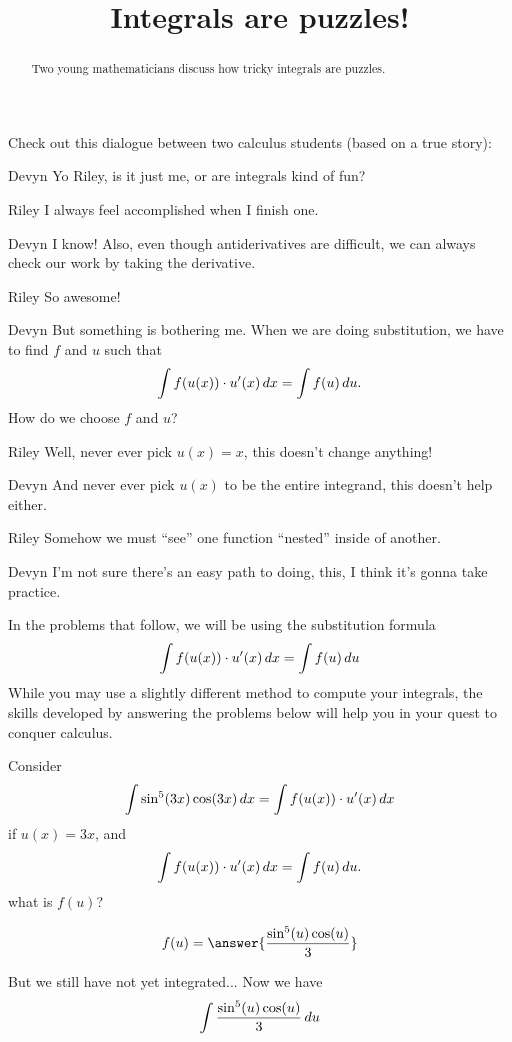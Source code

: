 \documentclass{ximera}
\title[Break-Ground:]{Integrals are puzzles!}
\begin{document}
\begin{abstract}
Two young mathematicians discuss how tricky integrals are puzzles.
\end{abstract}
\maketitle

Check out this dialogue between two calculus students (based on a true
story):

\begin{dialogue}
\item[Devyn] Yo Riley, is it just me, or are integrals kind of fun?
\item[Riley] I always feel accomplished when I finish one.
\item[Devyn] I know! Also, even though antiderivatives are difficult,
  we can always check our work by taking the derivative.
\item[Riley] So awesome!
\item[Devyn] But something is bothering me. When we are doing substitution,
  we have to find $f$ and $u$ such that
  \[
  \int f(u(x)) \cdot u'(x) \mathop{}\!d x = \int f(u) \mathop{}\!d u.
  \]
  How do we choose $f$ and $u$?
\item[Riley] Well, never ever pick $u(x) = x$, this doesn't change
    anything!
\item[Devyn] And never ever pick $u(x)$ to be the entire integrand,
  this doesn't help either.
\item[Riley] Somehow we must ``see'' one function ``nested'' inside of
  another.
\item[Devyn] I'm not sure there's an easy path to doing, this, I think
  it's gonna take practice.
\end{dialogue}


In the problems that follow, we will be using the substitution formula
\[
   \int f(u(x)) \cdot u'(x) \mathop{}\!d x = \int f(u) \mathop{}\!d u
\]
While you may use a slightly different method to compute your
integrals, the skills developed by answering the problems below will
help you in your quest to conquer calculus.

\begin{problem}
  Consider
  \[
  \int \sin^5(3x) \cos(3x) \mathop{}\!d x = \int f(u(x)) \cdot u'(x) \mathop{}\!d x
  \]
  if $u(x) = 3x$, and 
  \[
  \int f(u(x)) \cdot u'(x) \mathop{}\!d x = \int f(u) \mathop{}\!d u.
  \]
  what is $f(u)$?
  \begin{prompt}
    \[
    f(u) = \answer{
      \frac{\sin^5(u) \cos(u)}{3}}
    \]
  \end{prompt}
  
  But we still have not yet integrated... Now we have 
  \[
    \int \frac{\sin^5(u) \cos(u)}{3} \mathop{}\!d u
    \]
  
\end{problem}
\end{document}
